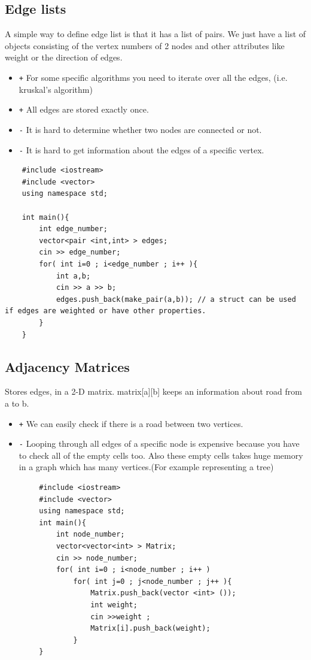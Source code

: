 \documentclass[12pt]{article}
\begin{document}
    \subsection{Edge lists}
        A simple way to define edge list is that it has a list of pairs. We just have a list of objects consisting of the vertex numbers of 2 nodes and other attributes like weight or the direction of edges. \cite{16}
        \begin{itemize}
             \item \texttt + For some specific algorithms you need to iterate over all the edges, (i.e. kruskal's algorithm)
             \item \texttt + All edges are stored exactly once.
             \item \texttt - It is hard to determine whether two nodes are connected or not.
             \item \texttt - It is hard to get information about the edges of a specific vertex.
         \end{itemize}
    \begin{verbatim}
    #include <iostream>
    #include <vector>
    using namespace std;
    
    int main(){
        int edge_number;
        vector<pair <int,int> > edges;
        cin >> edge_number;
        for( int i=0 ; i<edge_number ; i++ ){
            int a,b;
            cin >> a >> b;
            edges.push_back(make_pair(a,b)); // a struct can be used if edges are weighted or have other properties.
        }
    }
    \end{verbatim}
    \subsection{Adjacency Matrices}
        Stores edges, in a 2-D matrix. matrix[a][b] keeps an information about road from a to b. \cite{16}
        \begin{itemize}
             \item \texttt + We can easily check if there is a road between two vertices.
             \item \texttt - Looping through all edges of a specific node is expensive because you have to check all of the empty cells too. Also these empty cells takes huge memory in a graph which has many vertices.(For example representing a tree)
         \end{itemize}
        \begin{verbatim}
        #include <iostream>
        #include <vector>
        using namespace std;
        int main(){
            int node_number;
            vector<vector<int> > Matrix;
            cin >> node_number;
            for( int i=0 ; i<node_number ; i++ )
                for( int j=0 ; j<node_number ; j++ ){
                    Matrix.push_back(vector <int> ());
                    int weight;
                    cin >>weight ;
                    Matrix[i].push_back(weight);
                }
        }
        \end{verbatim}
\end{document}
